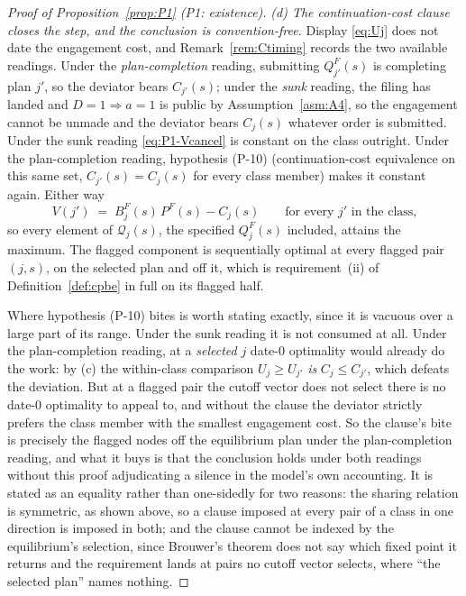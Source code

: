 \documentclass[11pt]{article}
\begin{document}
\begin{proof}[Proof of Proposition~\ref{prop:P1} (P1: existence)]
\emph{(d) The continuation-cost clause closes the step, and the conclusion is convention-free.}
Display \eqref{eq:Uj} does not date the engagement cost, and Remark~\ref{rem:Ctiming} records the two
available readings. Under the \emph{plan-completion} reading, submitting $Q_{j'}^F(s)$ is completing
plan $j'$, so the deviator bears $C_{j'}(s)$; under the \emph{sunk} reading, the filing has landed
and $D = 1 \Rightarrow a = 1$ is public by Assumption~\ref{asm:A4}, so the engagement cannot be
unmade and the deviator bears $C_j(s)$ whatever order is submitted. Under the sunk reading
\eqref{eq:P1-Vcancel} is constant on the class outright. Under the plan-completion reading,
hypothesis (P-10) (continuation-cost equivalence on this same set, $C_{j'}(s) = C_j(s)$ for every
class member) makes it constant again. Either way
\[
V(j') \;=\; B_j^F(s)\,P^F(s) - C_j(s)
\qquad \text{for every } j' \text{ in the class,}
\]
so every element of $\mathcal Q_j(s)$, the specified $Q_j^F(s)$ included, attains the maximum. The
flagged component is sequentially optimal at every flagged pair $(j,s)$, on the selected plan and off
it, which is requirement~(ii) of Definition~\ref{def:cpbe} in full on its flagged half.

Where hypothesis (P-10) bites is worth stating exactly, since it is vacuous over a large part of its
range. Under the sunk reading it is not consumed at all. Under the plan-completion reading, at a
\emph{selected} $j$ date-$0$ optimality would already do the work: by (c) the within-class comparison
$U_j \ge U_{j'}$ \emph{is} $C_j \le C_{j'}$, which defeats the deviation. But at a flagged pair the
cutoff vector does not select there is no date-$0$ optimality to appeal to, and without the clause the
deviator strictly prefers the class member with the smallest engagement cost. So the clause's bite is
precisely the flagged nodes off the equilibrium plan under the plan-completion reading, and what it
buys is that the conclusion holds under both readings without this proof adjudicating a silence in
the model's own accounting. It is stated as an equality rather than one-sidedly for two reasons: the
sharing relation is symmetric, as shown above, so a clause imposed at every pair of a class in one
direction is imposed in both; and the clause cannot be indexed by the equilibrium's selection, since
Brouwer's theorem does not say which fixed point it returns and the requirement lands at pairs no
cutoff vector selects, where ``the selected plan'' names nothing.


\end{proof}
\end{document}
